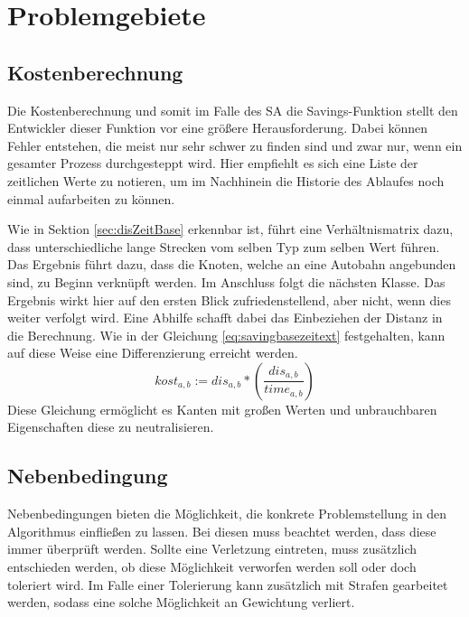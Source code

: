

\chapter{Problemgebiete}

\section{Kostenberechnung}

Die Kostenberechnung und somit im Falle des SA die Savings-Funktion stellt den Entwickler dieser Funktion vor eine größere Herausforderung. 
Dabei können Fehler entstehen, die meist nur sehr schwer zu finden sind und zwar nur, wenn ein gesamter Prozess durchgesteppt wird. 
Hier empfiehlt es sich eine Liste der zeitlichen Werte zu notieren, um im Nachhinein die Historie des Ablaufes noch einmal aufarbeiten zu können. 

\noindent
Wie in Sektion \ref{sec:disZeitBase} erkennbar ist, führt eine Verhältnismatrix dazu, dass unterschiedliche lange Strecken vom selben Typ zum selben Wert führen. 
Das Ergebnis führt dazu, dass die Knoten, welche an eine Autobahn angebunden sind, zu Beginn verknüpft werden. 
Im Anschluss folgt die nächsten Klasse. 
Das Ergebnis wirkt hier auf den ersten Blick zufriedenstellend, aber nicht, wenn dies weiter verfolgt wird. 
Eine Abhilfe schafft dabei das Einbeziehen der Distanz in die Berechnung. 
Wie in der Gleichung \ref{eq:savingbasezeitext} festgehalten, kann auf diese Weise eine Differenzierung erreicht werden. 
\begin{equation}
kost_{a,b} := dis_{a,b} * (\frac{dis_{a,b}}{time_{a,b}})
\label{eq:savingbasezeitext}
\end{equation}
Diese Gleichung ermöglicht es Kanten mit großen Werten und unbrauchbaren Eigenschaften diese zu neutralisieren. 

\section{Nebenbedingung}

Nebenbedingungen bieten die Möglichkeit, die konkrete Problemstellung in den Algorithmus einfließen zu lassen. 
Bei diesen muss beachtet werden, dass diese immer überprüft werden. 
Sollte eine Verletzung eintreten, muss zusätzlich entschieden werden, ob diese Möglichkeit verworfen werden soll oder doch toleriert wird. 
Im Falle einer Tolerierung kann zusätzlich mit Strafen gearbeitet werden, sodass eine solche Möglichkeit an Gewichtung verliert. 

